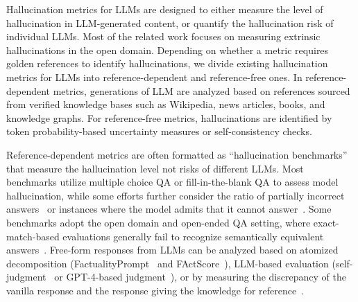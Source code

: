 Hallucination metrics for LLMs are designed to either measure the level of hallucination in LLM-generated content, or quantify the hallucination risk of individual LLMs. Most of the related work focuses on measuring extrinsic hallucinations in the open domain. Depending on whether a metric requires golden references to identify hallucinations, we divide existing hallucination metrics for LLMs into reference-dependent and reference-free ones. In reference-dependent metrics, generations of LLM are analyzed based on references sourced from verified knowledge bases such as Wikipedia, news articles, books, and knowledge graphs. For reference-free metrics, hallucinations are identified by token probability-based uncertainty measures or self-consistency checks.

Reference-dependent metrics are often formatted as ``hallucination benchmarks'' that measure the hallucination level not risks of different LLMs. Most benchmarks utilize multiple choice QA or fill-in-the-blank QA to assess model hallucination, while some efforts further consider the ratio of partially incorrect answers~ or instances where the model admits that it cannot answer~. Some benchmarks adopt the open domain and open-ended QA setting, where exact-match-based evaluations generally fail to recognize semantically equivalent answers~. Free-form responses from LLMs can be analyzed based on atomized decomposition (FactualityPrompt~ and FActScore~), LLM-based evaluation (self-judgment~ or GPT-4-based judgment~), or by measuring the discrepancy of the vanilla response and the response giving the knowledge for reference~.

